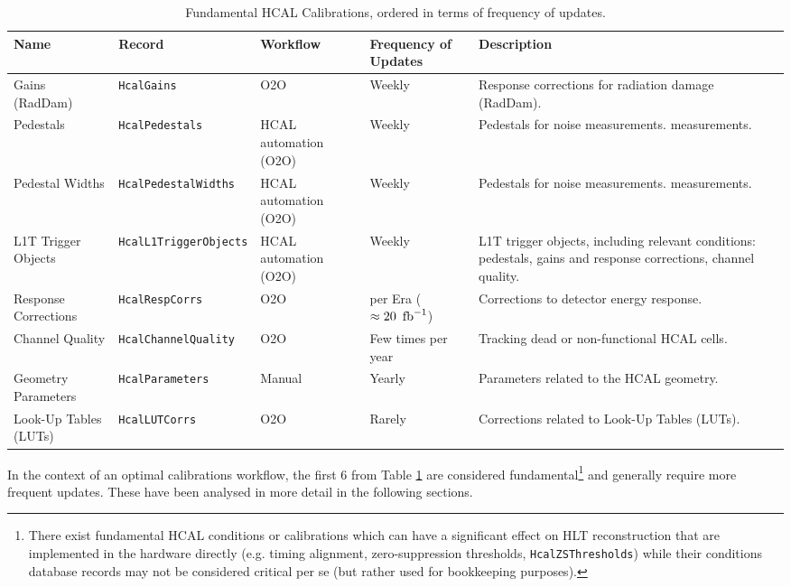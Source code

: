 \begin{table}[h!]
    \centering
    \begin{adjustbox}{max width=\textwidth}
    \begin{tabular}{p{3.5cm}|p{4cm}|p{2.5cm}|p{2cm}|p{4.5cm}}
        \textbf{Name} & \textbf{Record} & \textbf{Workflow} & \textbf{Frequency of Updates} & \textbf{Description} \\ \hline
        Gains (RadDam) & \texttt{HcalGains} & O2O & Weekly & Response corrections for radiation damage (RadDam). \\
         Pedestals & \texttt{HcalPedestals} & HCAL automation (O2O) & Weekly & Pedestals for noise measurements.
measurements.\\
        Pedestal Widths & \texttt{HcalPedestalWidths} & HCAL automation (O2O) & Weekly & Pedestals for noise measurements.
measurements. \\
        L1T Trigger Objects & \texttt{HcalL1TriggerObjects} & HCAL automation (O2O) & Weekly & L1T trigger objects, including relevant conditions: pedestals, gains and response corrections, channel quality. \\
        Response Corrections & \texttt{HcalRespCorrs} & O2O & per Era ($\approx 20~\mbox{\ensuremath{\,\text{fb}^{-1}}}$) & Corrections to detector energy response. \\
        Channel Quality & \texttt{HcalChannelQuality} & O2O & Few times per year & Tracking dead or non-functional HCAL cells. \\
        Geometry Parameters & \texttt{HcalParameters} & Manual & Yearly & Parameters related to the HCAL geometry. \\
        Look-Up Tables (LUTs) & \texttt{HcalLUTCorrs} & O2O & Rarely & Corrections related to Look-Up Tables (LUTs). \\
    \end{tabular}
    \end{adjustbox}
    \caption{Fundamental HCAL Calibrations, ordered in terms of frequency of updates.}
    \label{tab:HCALCalibrations_critical}
\end{table}

In the context of an optimal calibrations workflow, the first 6 from Table \ref{tab:HCALCalibrations_critical} are considered fundamental\footnote{There exist fundamental HCAL conditions or calibrations which can have a significant effect on HLT reconstruction that are implemented in the hardware directly (e.g. timing alignment, zero-suppression thresholds, \texttt{HcalZSThresholds}) while their conditions database records may not be considered critical per se (but rather used for bookkeeping purposes).} and generally require more frequent updates. These have been analysed in more detail in the following sections. %

